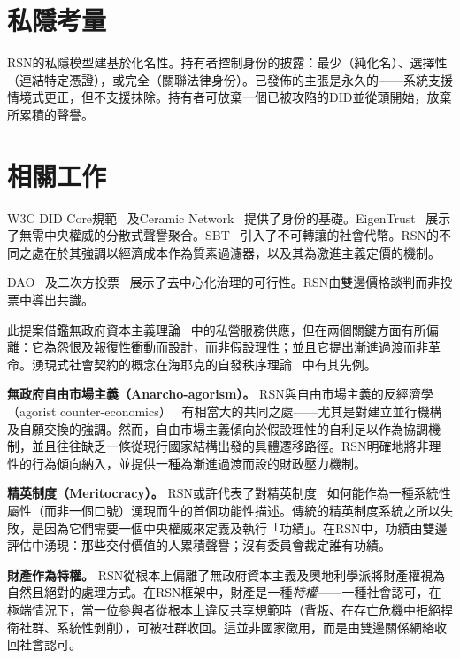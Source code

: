 \documentclass[11pt,a4paper,twocolumn]{article}
\begin{document}
\section{私隱考量}

RSN的私隱模型建基於化名性。持有者控制身份的披露：最少（純化名）、選擇性（連結特定憑證），或完全（關聯法律身份）。已發佈的主張是永久的——系統支援情境式更正，但不支援抹除。持有者可放棄一個已被攻陷的DID並從頭開始，放棄所累積的聲譽。

\section{相關工作}

W3C DID Core規範~\cite{did2022} 及Ceramic Network~\cite{ceramic2023} 提供了身份的基礎。EigenTrust~\cite{kamvar2003} 展示了無需中央權威的分散式聲譽聚合。SBT~\cite{weyl2022} 引入了不可轉讓的社會代幣。RSN的不同之處在於其強調以經濟成本作為質素過濾器，以及其為激進主義定價的機制。

DAO~\cite{buterin2014} 及二次方投票~\cite{buterin2019} 展示了去中心化治理的可行性。RSN由雙邊價格談判而非投票中導出共識。

此提案借鑑無政府資本主義理論~\cite{rothbard1973,hoppe2001} 中的私營服務供應，但在兩個關鍵方面有所偏離：它為怨恨及報復性衝動而設計，而非假設理性；並且它提出漸進過渡而非革命。湧現式社會契約的概念在海耶克的自發秩序理論~\cite{hayek1973} 中有其先例。

\textbf{無政府自由市場主義（Anarcho-agorism）。} RSN與自由市場主義的反經濟學（agorist counter-economics）~\cite{konkin2006} 有相當大的共同之處——尤其是對建立並行機構及自願交換的強調。然而，自由市場主義傾向於假設理性的自利足以作為協調機制，並且往往缺乏一條從現行國家結構出發的具體遷移路徑。RSN明確地將非理性的行為傾向納入，並提供一種為漸進過渡而設的財政壓力機制。

\textbf{精英制度（Meritocracy）。} RSN或許代表了對精英制度~\cite{young1958} 如何能作為一種系統性屬性（而非一個口號）湧現而生的首個功能性描述。傳統的精英制度系統之所以失敗，是因為它們需要一個中央權威來定義及執行「功績」。在RSN中，功績由雙邊評估中湧現：那些交付價值的人累積聲譽；沒有委員會裁定誰有功績。

\textbf{財產作為特權。} RSN從根本上偏離了無政府資本主義及奧地利學派將財產權視為自然且絕對的處理方式。在RSN框架中，財產是一種\emph{特權}——一種社會認可，在極端情況下，當一位參與者從根本上違反共享規範時（背叛、在存亡危機中拒絕捍衛社群、系統性剝削），可被社群收回。這並非國家徵用，而是由雙邊關係網絡收回社會認可。
\end{document}
